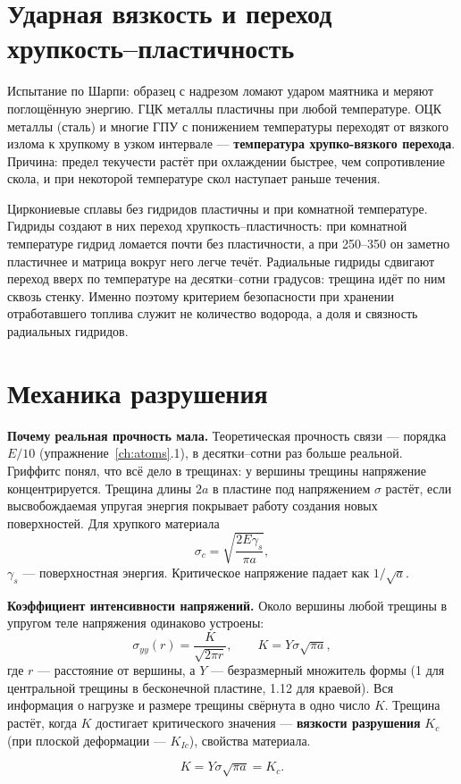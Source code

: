 \section{Ударная вязкость и переход хрупкость--пластичность}

Испытание по Шарпи: образец с надрезом ломают ударом маятника и меряют поглощённую энергию. ГЦК металлы пластичны при
любой температуре. ОЦК металлы (сталь) и многие ГПУ с понижением температуры переходят от вязкого излома к
хрупкому в узком интервале --- \textbf{температура хрупко-вязкого перехода}. Причина: предел текучести растёт при
охлаждении быстрее, чем сопротивление скола, и при некоторой температуре скол наступает раньше течения.

\begin{zrbox}
Циркониевые сплавы без гидридов пластичны и при комнатной температуре. Гидриды создают в них переход
хрупкость--пластичность: при комнатной температуре гидрид ломается почти без пластичности, а при 250--350\degC{}
он заметно пластичнее и матрица вокруг него легче течёт. Радиальные гидриды сдвигают переход вверх по температуре
на десятки--сотни градусов: трещина идёт по ним сквозь стенку. Именно поэтому критерием безопасности при
хранении отработавшего топлива служит не количество водорода, а доля и связность радиальных гидридов.
\end{zrbox}

\section{Механика разрушения}

\textbf{Почему реальная прочность мала.} Теоретическая прочность связи --- порядка $E/10$ (упражнение~\ref{ch:atoms}.1),
в десятки--сотни раз больше реальной. Гриффитс понял, что всё дело в трещинах: у вершины трещины напряжение концентрируется.
Трещина длины $2a$ в пластине под напряжением $\sigma$ растёт, если высвобождаемая упругая энергия покрывает работу
создания новых поверхностей. Для хрупкого материала
\begin{equation}
\sigma_c = \sqrt{\frac{2E\gamma_s}{\pi a}},
\end{equation}
$\gamma_s$ --- поверхностная энергия. Критическое напряжение падает как $1/\sqrt a$.

\textbf{Коэффициент интенсивности напряжений.} Около вершины любой трещины в упругом теле напряжения одинаково
устроены:
\begin{equation}
\sigma_{yy}(r) = \frac{K}{\sqrt{2\pi r}},\qquad K = Y\sigma\sqrt{\pi a},
\end{equation}
где $r$ --- расстояние от вершины, а $Y$ --- безразмерный множитель формы (1 для центральной трещины в бесконечной
пластине, 1.12 для краевой). Вся информация о нагрузке и размере трещины свёрнута в одно число $K$. Трещина растёт,
когда $K$ достигает критического значения --- \textbf{вязкости разрушения} $K_c$ (при плоской деформации --- $K_{Ic}$),
свойства материала.
\begin{keyf}
\[
K = Y\sigma\sqrt{\pi a} = K_{c}.
\]
\end{keyf}

